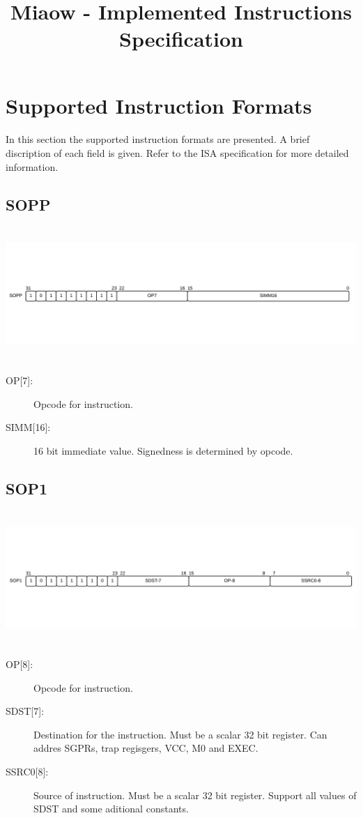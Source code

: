 \documentclass{article}
\title{Miaow - Implemented Instructions Specification}
\begin{document}
\maketitle
\section{Supported Instruction Formats}
\paragraph{}In this section the supported instruction formats are presented. A brief discription of each field is given. Refer to the ISA specification for more detailed information.
\subsection{SOPP}
\includegraphics[width=7in, height=2in]{sopp.png} \\
\begin{description}
  \item [{OP[7]:}] Opcode for instruction.
  \item [{SIMM[16]:}] 16 bit immediate value. Signedness is determined by opcode.
\end{description}
\subsection{SOP1}
\includegraphics[width=7in, height=2in]{sop1.png} \\
\begin{description}
  \item [{OP[8]:}] Opcode for instruction.
  \item [{SDST[7]:}] Destination for the instruction. Must be a scalar 32 bit register. Can addres SGPRs, trap regisgers, VCC, M0 and EXEC.
  \item [{SSRC0[8]:}] Source of instruction. Must be a scalar 32 bit register. Support all values of SDST and some aditional constants.
\end{description}
\end{document}
